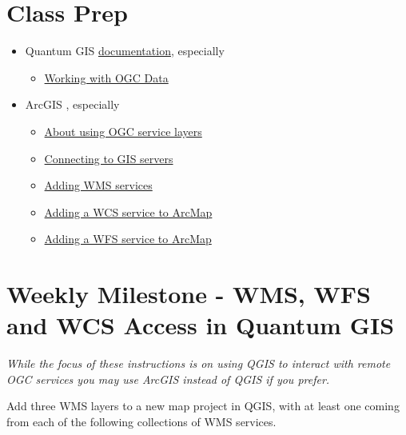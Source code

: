 \documentclass[]{book}
\providecommand{\tightlist}{%
  \setlength{\itemsep}{0pt}\setlength{\parskip}{0pt}}
\begin{document}
\section{Class Prep}\label{week12-prep}

\begin{itemize}
\tightlist
\item
  Quantum GIS
  \href{http://docs.qgis.org/2.8/en/docs/user_manual/}{documentation},
  especially

  \begin{itemize}
  \tightlist
  \item
    \href{http://docs.qgis.org/2.8/en/docs/user_manual/working_with_ogc/index.html}{Working
    with OGC Data}
  \end{itemize}
\item
  ArcGIS \href{}{}, especially

  \begin{itemize}
  \tightlist
  \item
    \href{http://desktop.arcgis.com/en/arcmap/10.3/map/web-maps-and-services/about-using-ogc-service-layers.htm}{About
    using OGC service layers}
  \item
    \href{http://desktop.arcgis.com/en/arcmap/10.3/manage-data/using-arccatalog/connecting-to-gis-servers.htm}{Connecting
    to GIS servers}
  \item
    \href{http://desktop.arcgis.com/en/arcmap/10.3/map/web-maps-and-services/adding-wms-services.htm}{Adding
    WMS services}
  \item
    \href{http://desktop.arcgis.com/en/arcmap/10.3/map/web-maps-and-services/adding-a-wcs-service-to-arcmap.htm}{Adding
    a WCS service to ArcMap}
  \item
    \href{http://desktop.arcgis.com/en/arcmap/10.3/map/web-maps-and-services/adding-a-wfs-service-to-arcmap.htm}{Adding
    a WFS service to ArcMap}
  \end{itemize}
\end{itemize}

\section{Weekly Milestone - WMS, WFS and WCS Access in Quantum
GIS}\label{week12-milestone}

\emph{While the focus of these instructions is on using QGIS to interact
with remote OGC services you may use ArcGIS instead of QGIS if you
prefer.}

Add three WMS layers to a new map project in QGIS, with at least one
coming from each of the following collections of WMS services.
\end{document}
